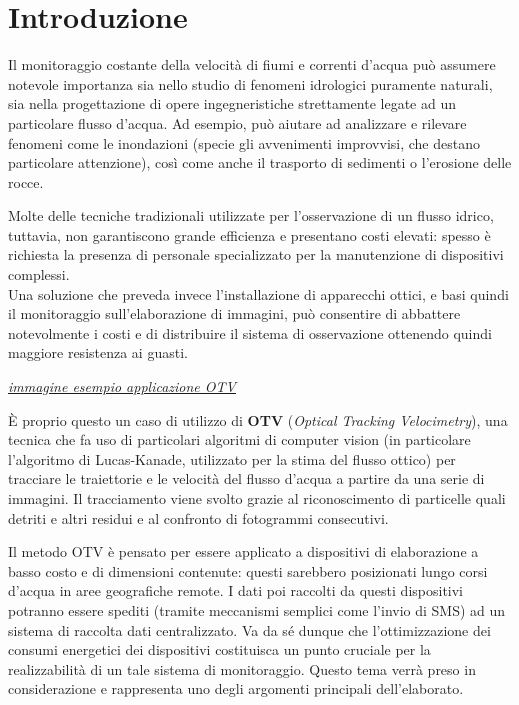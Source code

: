 \chapter*{Introduzione}

Il monitoraggio costante della velocità di fiumi e correnti d'acqua può assumere notevole importanza sia nello studio di 
fenomeni idrologici puramente naturali, sia nella progettazione di opere ingegneristiche strettamente legate ad un 
particolare flusso d'acqua. Ad esempio, può aiutare ad analizzare e rilevare fenomeni come le inondazioni (specie gli 
avvenimenti improvvisi, che destano particolare attenzione), così come anche il trasporto di sedimenti o 
l'erosione delle rocce.

Molte delle tecniche tradizionali utilizzate per l'osservazione di un flusso idrico, tuttavia, non garantiscono 
grande efficienza e presentano costi elevati: spesso è richiesta la presenza di personale specializzato per la 
manutenzione di dispositivi complessi.\cite{rs10122010}\\ %
Una soluzione che preveda invece l'installazione di apparecchi ottici, e basi quindi il monitoraggio sull'elaborazione di
immagini, può consentire di abbattere notevolmente i costi e di distribuire il sistema di osservazione ottenendo quindi 
maggiore resistenza ai guasti.%

\textit{\underline{immagine esempio applicazione OTV}}

È proprio questo un caso di utilizzo di \textbf{OTV} (\textit{Optical Tracking Velocimetry}), una tecnica che fa uso di 
particolari algoritmi di computer vision (in particolare l'algoritmo di Lucas-Kanade, utilizzato per la stima del flusso 
ottico) per tracciare le traiettorie e le velocità del flusso d'acqua a partire da una serie di immagini. 
Il tracciamento viene svolto grazie al riconoscimento di particelle quali detriti e altri residui e al confronto di fotogrammi 
consecutivi.

Il metodo OTV è pensato per essere applicato a dispositivi di elaborazione a basso costo e di dimensioni contenute: questi
sarebbero posizionati lungo corsi d'acqua in aree geografiche remote. I dati poi raccolti da questi dispositivi potranno essere
spediti (tramite meccanismi semplici come l'invio di SMS) ad un sistema di raccolta dati centralizzato.
Va da sé dunque che l'ottimizzazione dei consumi energetici dei dispositivi costituisca un punto cruciale per la 
realizzabilità di un tale sistema di monitoraggio. Questo tema verrà preso in considerazione e rappresenta uno degli argomenti
principali dell'elaborato.\\

